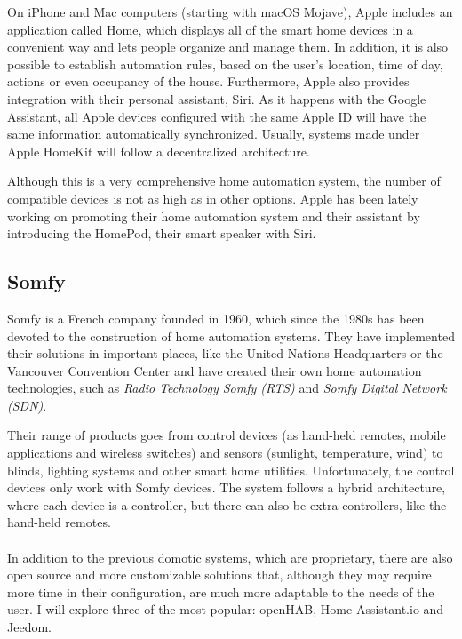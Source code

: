 On iPhone and Mac computers (starting with macOS Mojave), Apple includes an application called Home, which displays all 
of the smart home devices in a convenient way and lets people organize and manage them. In addition, it is also possible to establish 
automation rules, based on the user's location, time of day, actions or even occupancy of the house. Furthermore, Apple also provides
integration with their personal assistant, Siri. As it happens with the Google Assistant, all Apple devices configured with the same Apple 
ID will have the same information automatically synchronized.\cite{appleIOSHome} Usually, systems made under Apple HomeKit will follow
a decentralized architecture.

Although this is a very comprehensive home automation system, the number of compatible devices is not as high as in other options. 
Apple has been lately working on promoting their home automation system and their assistant by introducing the HomePod, their smart
speaker with Siri.

\subsection{Somfy}
Somfy is a French company founded in 1960, which since the 1980s has been devoted to the construction of home automation systems.
They have implemented their solutions in important places, like the United Nations Headquarters or the Vancouver Convention Center 
and have created their own home automation technologies, such as \textit{Radio Technology Somfy (RTS)} and \textit{Somfy Digital 
Network (SDN)}.\cite{somfyOurStory}

Their range of products goes from control devices (as hand-held remotes, mobile applications and wireless switches) and sensors (sunlight,
temperature, wind) to blinds, lighting systems and other smart home utilities. Unfortunately, the control devices only work with Somfy 
devices. The system follows a hybrid architecture, where each device is a controller, but there can also be extra controllers, like the 
hand-held remotes.
\\~\\

In addition to the previous domotic systems, which are proprietary, there are also open source and more customizable solutions that, 
although they may require more time in their configuration, are much more adaptable to the needs of the user. I will explore three of
the most popular: openHAB, Home-Assistant.io and Jeedom.

